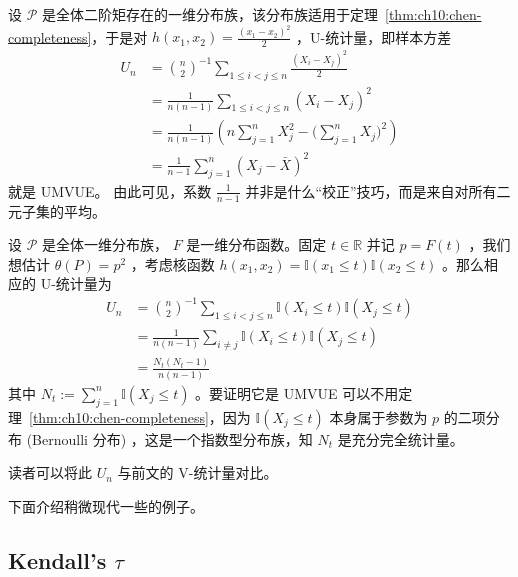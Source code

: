 \begin{example}[方差]\label{ex:ch10:variance}
设 $\mathscr P$ 是全体二阶矩存在的一维分布族，该分布族适用于定理~\ref{thm:ch10:chen-completeness}，于是对 $h(x_1,x_2)=\tfrac{(x_1-x_2)^2}{2}$ ，U-统计量，即样本方差
\[\begin{aligned} U_n &= \binom{n}{2}^{-1} \sum_{1 \le i < j \le n} \frac{(X_i - X_j)^2}{2} \\ &= \frac{1}{n(n-1)} \sum_{1 \le i < j \le n} (X_i - X_j)^2 \\ &= \frac{1}{n(n-1)} \left( n \sum_{j=1}^n X_j^2 - \biggl(\sum_{j=1}^n X_j\biggr)^2 \right) \\ &= \frac{1}{n-1}\sum_{j=1}^n (X_j - \bar{X})^2 \end{aligned}\]
就是 UMVUE。
由此可见，系数 $\tfrac1{n-1}$ 并非是什么``校正''技巧，而是来自对所有二元子集的平均。
\end{example}



\begin{example}[分布函数平方的无偏估计]
设 $\mathscr P$ 是全体一维分布族， $F$ 是一维分布函数。固定 $t\in\mathbb R$ 并记 $p=F(t)$ ，我们想估计 $\theta(P)=p^2$ ，考虑核函数 $h(x_1,x_2)=\mathbb I(x_1\le t)\mathbb I(x_2\le t)$ 。那么相应的 U-统计量为
\[\begin{aligned} U_n &={\binom n2}^{-1}\sum_{1\le i<j\le n} \mathbb{I}(X_i\le t)\mathbb{I}(X_j\le t)\\&=\frac{1}{n(n-1)}\sum_{i\neq j}\mathbb{I}(X_i\le t)\mathbb{I}(X_j\le t) \\ &= \frac{N_t(N_t-1)}{n(n-1)} \end{aligned}\]
其中 $\textstyle N_t := \sum_{j=1}^n \mathbb{I}(X_j\le t)$ 。要证明它是 UMVUE 可以不用定理~\ref{thm:ch10:chen-completeness}，因为 $\mathbb I(X_j\le t)$ 本身属于参数为 $p$ 的二项分布 (Bernoulli 分布) ，这是一个指数型分布族，知 $N_t$ 是充分完全统计量。

读者可以将此 $U_n$ 与前文的 V-统计量对比。

\end{example}

下面介绍稍微现代一些的例子。


\subsection{Kendall's $\tau$}


